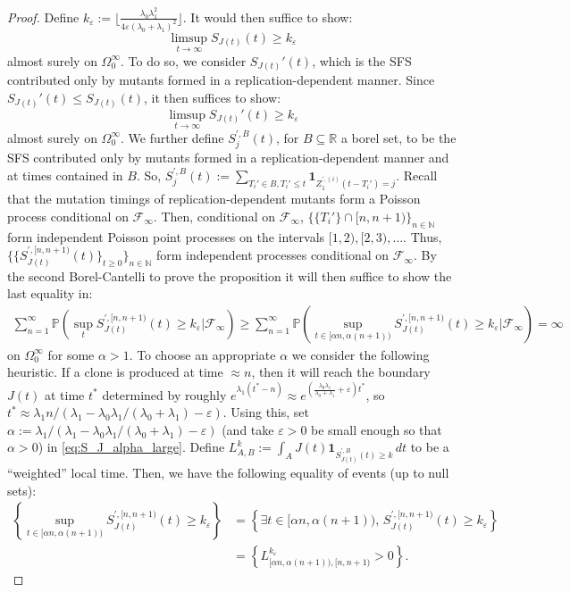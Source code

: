 \documentclass[10pt,a4paper]{amsart}
\begin{document}
\begin{proof}
  Define $k_\varepsilon:=\lfloor \frac{\lambda_0\lambda_1^2}{4\varepsilon(\lambda_0+\lambda_1)^2}\rfloor $. It would then suffice to show:
  \[\limsup_{t\to\infty}S_{J(t)}(t)\geq k_\varepsilon\]
  almost surely on $\Omega_0^\infty$. To do so, we consider $S_{J(t)}'(t)$, which is the SFS contributed only by mutants formed in a replication-dependent manner. Since $S_{J(t)}'(t)\leq S_{J(t)}(t)$, it then suffices to show:
  \[\limsup_{t\to\infty}S_{J(t)}'(t)\geq k_\varepsilon\]
  almost surely on $\Omega_0^\infty$. We further define $S_j^{',B}(t)$, for $B\subseteq \mathbb{R}$ a borel set, to be the SFS contributed only by mutants formed in a replication-dependent manner and at times contained in $B$. So, $S_{j}^{',B}(t):=\sum_{T_i'\in B,T_i'\leq t}\mathbf{1}_{Z_1^{',(i)}(t-T_i')=j}$. Recall that the mutation timings of replication-dependent mutants form a Poisson process conditional on $\mathcal{F}_\infty$. Then, conditional on $\mathcal{F}_\infty$, $\{\{T_i'\}\cap [n,n+1)\}_{n\in\mathbb{N}}$ form independent Poisson point processes on the intervals $[1,2),[2,3),\dots$. Thus, $\{\{S_{J(t)}^{',[n,n+1)}(t)\}_{t\geq 0}\}_{n\in\mathbb{N}}$ form independent processes conditional on $\mathcal{F}_\infty$. By the second Borel-Cantelli to prove the proposition it will then suffice to show the last equality in:
  \begin{align}
    \sum_{n=1}^\infty \mathbb{P}(\sup_{t}S_{J(t)}^{',[n,n+1)}(t)\geq k_\varepsilon|\mathcal{F}_\infty)\geq \sum_{n=1}^\infty \mathbb{P}(\sup_{t\in [\alpha n,\alpha(n+1))}S_{J(t)}^{',[n,n+1)}(t)\geq k_\varepsilon|\mathcal{F}_\infty)= \infty\label{eq:S_J_alpha_large}
  \end{align}
  on $\Omega_0^\infty$ for some $\alpha>1$. To choose an appropriate $\alpha$ we consider the following heuristic. If a clone is produced at time $\approx n$, then it will reach the boundary $J(t)$ at time $t^*$ determined by roughly $e^{\lambda_1 (t^*-n)}\approx e^{\left(\frac{\lambda_0\lambda_1}{\lambda_0+\lambda_1}+\varepsilon\right)t^*}$, so $t^*\approx \lambda_1n/\left(\lambda_1-\lambda_0\lambda_1/(\lambda_0+\lambda_1)-\varepsilon\right)$. Using this, set $\alpha:= \lambda_1/\left(\lambda_1-\lambda_0\lambda_1/(\lambda_0+\lambda_1)-\varepsilon\right)$ (and take $\varepsilon>0$ be small enough so that $\alpha>0$) in \ref{eq:S_J_alpha_large}. Define $L_{A,B}^k:=\int_{A} J(t)\mathbf{1}_{S_{J(t)}^{',B}(t)\geq k}\,dt$ to be a ``weighted'' local time. Then, we have the following equality of events (up to null sets):
  \begin{align*}
    \left\{\sup_{t\in [\alpha n,\alpha(n+1))}S_{J(t)}^{',[n,n+1)}(t)\geq k_\varepsilon\right\}&=\left\{\exists t\in [\alpha n,\alpha(n+1)),\,S_{J(t)}^{',[n,n+1)}(t)\geq k_\varepsilon\right\}\\
    &=\left\{L_{[\alpha n,\alpha (n+1)),[n,n+1)}^{k_\varepsilon}>0\right\}.
  \end{align*}


\end{proof}
\end{document}

